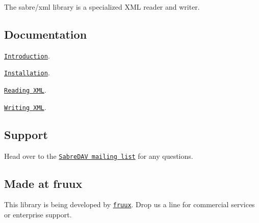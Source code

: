 \href{http://travis-ci.org/fruux/sabre-xml}{\tt }

The sabre/xml library is a specialized X\+ML reader and writer.

\subsection*{Documentation }


\begin{DoxyItemize}
\item \href{http://sabre.io/xml/}{\tt Introduction}.
\item \href{http://sabre.io/xml/install/}{\tt Installation}.
\item \href{http://sabre.io/xml/reading/}{\tt Reading X\+ML}.
\item \href{http://sabre.io/xml/writing/}{\tt Writing X\+ML}.
\end{DoxyItemize}

\subsection*{Support }

Head over to the \href{http://groups.google.com/group/sabredav-discuss}{\tt Sabre\+D\+AV mailing list} for any questions.

\subsection*{Made at fruux }

This library is being developed by \href{https://fruux.com/}{\tt fruux}. Drop us a line for commercial services or enterprise support. 